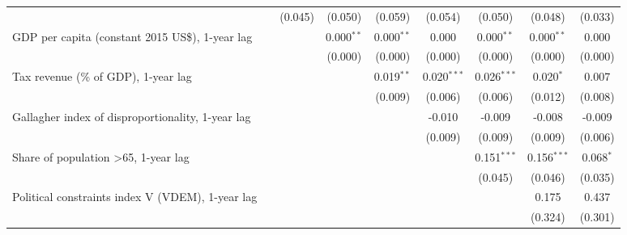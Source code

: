 \begin{table}[htbp]
\begin{tabular}{lcccccccc}
                                                                                      &               & (0.045)      & (0.050)      & (0.059)      & (0.054)       & (0.050)       & (0.048)       & (0.033)\\   
      GDP per capita (constant 2015 US\$), 1-year lag                                 &               &              & 0.000$^{**}$ & 0.000$^{**}$ & 0.000         & 0.000$^{**}$  & 0.000$^{**}$  & 0.000\\   
                                                                                      &               &              & (0.000)      & (0.000)      & (0.000)       & (0.000)       & (0.000)       & (0.000)\\   
      Tax revenue (\% of GDP), 1-year lag                                             &               &              &              & 0.019$^{**}$ & 0.020$^{***}$ & 0.026$^{***}$ & 0.020$^{*}$   & 0.007\\   
                                                                                      &               &              &              & (0.009)      & (0.006)       & (0.006)       & (0.012)       & (0.008)\\   
      Gallagher index of disproportionality, 1-year lag                               &               &              &              &              & -0.010        & -0.009        & -0.008        & -0.009\\   
                                                                                      &               &              &              &              & (0.009)       & (0.009)       & (0.009)       & (0.006)\\   
      Share of population >65, 1-year lag                                             &               &              &              &              &               & 0.151$^{***}$ & 0.156$^{***}$ & 0.068$^{*}$\\   
                                                                                      &               &              &              &              &               & (0.045)       & (0.046)       & (0.035)\\   
      Political constraints index V (VDEM), 1-year lag                                &               &              &              &              &               &               & 0.175         & 0.437\\   
                                                                                      &               &              &              &              &               &               & (0.324)       & (0.301)\\   

\end{tabular}
\end{table}
